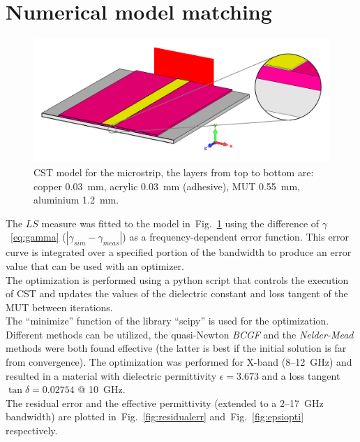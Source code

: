 \documentclass[11pt,a4paper]{article}
\newcommand{\fig}[1]{Fig.~\ref{#1}}
\newcommand{\laser}[1]{``#1''}
\begin{document}
    \section{Numerical model matching}
    \label{sec:numerical-model-matching}
    \begin{figure}[!t]
        \includegraphics[width=\textwidth]{fitter}
        \caption{CST model for the microstrip, the layers from top to bottom are: copper 0.03~mm, acrylic 0.03~mm
            (adhesive), MUT 0.55~mm, aluminium 1.2~mm.}
        \label{fig:fitter}
    \end{figure}
    The $LS$ measure was fitted to the model in~\fig{fig:fitter} using the difference of $\gamma$~\eqref{eq:gamma}
    ($|\gamma_{sim} - \gamma_{meas}|$) as a frequency-dependent error function.
    This error curve is integrated over a specified portion of the bandwidth to produce an error value that can be used
    with an optimizer.\\
    The optimization is performed using a python script that controls the execution of CST and updates the values of the
    dielectric constant and loss tangent of the MUT between iterations.\\
    The \laser{minimize} function of the library \laser{scipy} is used for the optimization.
    Different methods can be utilized, the quasi-Newton \emph{BCGF} and the \emph{Nelder-Mead} methods were both found
    effective (the latter is best if the initial solution is far from convergence).
    The optimization was performed for X-band (8--12~GHz) and resulted in a material with dielectric permittivity
    $\epsilon = 3.673 $ and a loss tangent $\tan \delta = 0.02754$ @ 10~GHz.\\
    The residual error and the effective permittivity (extended to a 2--17~GHz bandwidth) are plotted in~\fig{fig:residualerr}
    and~\fig{fig:epsiopti} respectively.
\end{document}
